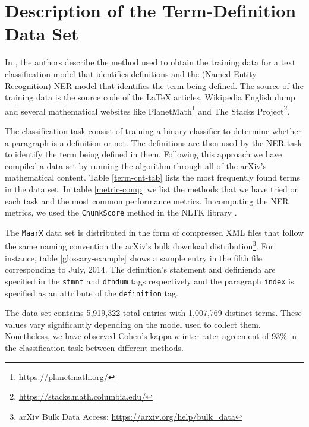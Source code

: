 \documentclass[11pt,a4paper]{article}
\begin{document}
\section{Description of the Term-Definition Data Set}
In \citep{glossary, Deyan1}, the authors describe the 
method used  to obtain the training data for a text classification
model that identifies definitions and the (Named Entity Recognition) NER model that identifies the term being defined. 
The source of the training data is the source code of the \LaTeX{} 
articles, Wikipedia English dump and several mathematical websites like
PlanetMath\footnote{\url{https://planetmath.org/}} and The Stacks
Project\footnote{\url{https://stacks.math.columbia.edu/}}.

The classification task consist of training a binary classifier to determine whether a paragraph is a definition or not.  The definitions are then used by the NER task to identify the term being defined in them.
Following this approach we have compiled a data set by running the 
algorithm through all of the arXiv's mathematical content. 
Table \ref{term-cnt-tab} lists the most frequently found terms in the
data set. In table \ref{metric-comp} we list the methods that we
have tried on each task and the most common performance metrics. In
computing the NER metrics, we used the \texttt{ChunkScore} method in
the NLTK library \cite{bird2009natural}. 

The \texttt{MaarX} data set is distributed in the form of compressed
XML
files that follow the same naming convention the arXiv's bulk download
distribution\footnote{arXiv Bulk Data Access: \url{https://arxiv.org/help/bulk\_data}}.
For instance, table \ref{glossary-example} shows a sample entry
in the fifth file corresponding to July, 2014. The definition's
statement and definienda are specified in the \texttt{stmnt} and
\texttt{dfndum} tags respectively and the paragraph \texttt{index} is
specified as an attribute of the \texttt{definition} tag.

The data set contains 5,919,322 total entries with 1,007,769 distinct
terms. These values vary significantly depending on the model used to
collect them. Nonetheless, we have observed Cohen's kappa $\kappa$
\cite{cohenkappa} inter-rater
agreement of 93\% in the classification task between different methods.
\end{document}
